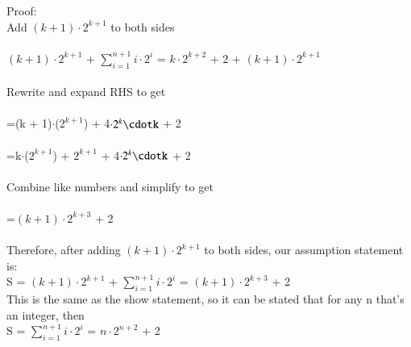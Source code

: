 \documentclass[12pt]{article}
\begin{document}
Proof: \\
	Add $(k + 1)\cdot 2^{k + 1}$ to both sides \\
	\\
	  $(k + 1)\cdot 2^{k + 1}$ + $\sum\limits_{i=1}^{n+1} i\cdot 2^{i}$ = $k\cdot 2^{k + 2}$ + 2 + $(k + 1)\cdot 2^{k + 1}$\\
	 \\
	 Rewrite and expand RHS to get\\
	 \\
	 =(k + 1)$\cdot$($2^{k+1}$) + 4$\cdot2^{k}\cdotk$ + 2\\
	 \\
	 =k$\cdot$($2^{k+1}$) + $2^{k+1}$ + 4$\cdot2^{k}\cdotk$ + 2\\
	 \\
	 Combine like numbers and simplify to get \\
	 \\
	 =$(k + 1)\cdot 2^{k + 3}$ + 2 \\
	 \\
	 Therefore, after adding $(k + 1)\cdot 2^{k + 1}$ to both sides, our assumption statement is: \\
	 S = $(k + 1)\cdot 2^{k + 1}$ + $\sum\limits_{i=1}^{n+1} i\cdot 2^{i}$ = $(k + 1)\cdot 2^{k + 3}$ + 2 \\
	 This is the same as the show statement, so it can be stated that for any n that's an integer, then \\
	 S = $\sum\limits_{i=1}^{n+1} i\cdot 2^{i}$ = $n\cdot 2^{n + 2}$ + 2 \\





\par



\end{document}
